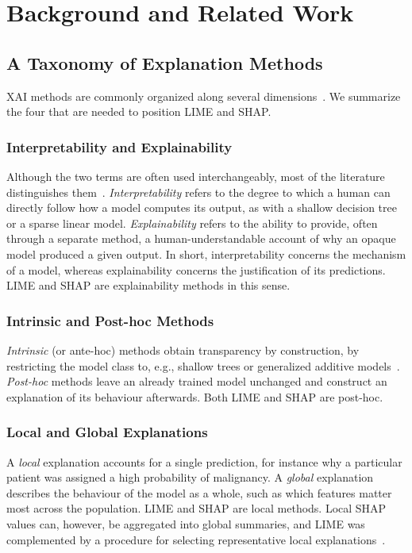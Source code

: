 \section{Background and Related Work}
\label{sec:background}

\subsection{A Taxonomy of Explanation Methods}
\label{sec:taxonomy}

XAI methods are commonly organized along several dimensions~\cite{BARREDOARRIETA202082, 10.1016/j.neucom.2024.128111}. We summarize the four that are needed to position LIME and SHAP.

\subsubsection{Interpretability and Explainability}
Although the two terms are often used interchangeably, most of the literature distinguishes them~\cite{10.1016/j.neucom.2024.128111}. \textit{Interpretability} refers to the degree to which a human can directly follow how a model computes its output, as with a shallow decision tree or a sparse linear model. \textit{Explainability} refers to the ability to provide, often through a separate method, a human-understandable account of why an opaque model produced a given output. In short, interpretability concerns the mechanism of a model, whereas explainability concerns the justification of its predictions. LIME and SHAP are explainability methods in this sense.

\subsubsection{Intrinsic and Post-hoc Methods}
\textit{Intrinsic} (or ante-hoc) methods obtain transparency by construction, by restricting the model class to, e.g., shallow trees or generalized additive models~\cite{BARREDOARRIETA202082}. \textit{Post-hoc} methods leave an already trained model unchanged and construct an explanation of its behaviour afterwards. Both LIME and SHAP are post-hoc.

\subsubsection{Local and Global Explanations}
A \textit{local} explanation accounts for a single prediction, for instance why a particular patient was assigned a high probability of malignancy. A \textit{global} explanation describes the behaviour of the model as a whole, such as which features matter most across the population. LIME and SHAP are local methods. Local SHAP values can, however, be aggregated into global summaries, and LIME was complemented by a procedure for selecting representative local explanations~\cite{ribeiro-etal-2016-trust}.

